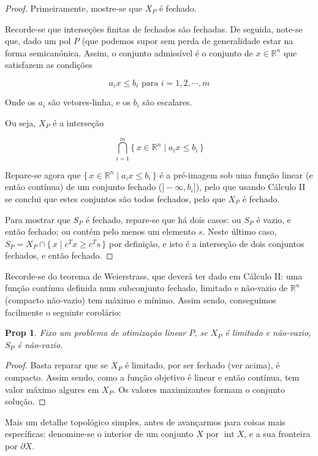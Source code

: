\documentclass{article}
\DeclareMathOperator{\interior}{int}
\newcommand{\R}{\mathbb{R}}
\newtheorem{prop}{Prop}
\theoremstyle{definition}
\begin{document}
	\begin{proof}
	Primeiramente, mostre-se que $X_P$ é fechado.
	
	Recorde-se que interseções finitas de fechados são fechadas. De seguida, note-se que, dado um pol $P$ (que podemos supor sem perda de generalidade estar na forma semicanónica. Assim, o conjunto admissível é o conjunto de $x \in \R^n$ que satisfazem as condições
	
	\[a_i x \leq b_i \text{ para $i = 1, 2, \cdots, m$}\]
	
	Onde os $a_i$ são vetores-linha, e os $b_i$ são escalares.
	
	Ou seja, $X_P$ é a interseção
	
	\[\bigcap_{i=1}^m \{\,x \in \R^n \mid a_i x \leq b_i \,\}\]
	
	Repare-se agora que $\{\,x \in \R^n \mid a_i x \leq b_i \,\}$ é a pré-imagem sob uma função linear (e então contínua) de um conjunto fechado ($]-\infty, b_i]$), pelo que usando Cálculo II se conclui que estes conjuntos são todos fechados, pelo que $X_P$ é fechado.
	
	Para mostrar que $S_P$ é fechado, repare-se que há dois casos: ou $S_P$ é vazio, e então fechado; ou contém pelo menos um elemento $s$. Neste último caso, $S_P = X_P \cap \{\,x \mid c^T x \geq c^T s\,\}$ por definição, e isto é a interseção de dois conjuntos fechados, e então fechado.
	\end{proof}
	
	Recorde-se do teorema de Weierstrass, que deverá ter dado em Cálculo II: uma função contínua definida num subconjunto fechado, limitado e não-vazio de $\R^n$ (compacto não-vazio) tem máximo e mínimo. Assim sendo, conseguimos facilmente o seguinte corolário:
	
	\begin{prop}
	Fixo um problema de otimização linear $P$, se $X_P$ é limitado e não-vazio, $S_P$ é não-vazio.
	\end{prop}
	\begin{proof}
	Basta reparar que se $X_P$ é limitado, por ser fechado (ver acima), é compacto. Assim sendo, como a função objetivo é linear e então contínua, tem valor máximo algures em $X_P$. Os valores maximizantes formam o conjunto solução.
	\end{proof}
	
	Mais um detalhe topológico simples, antes de avançarmos para coisas mais específicas: denomine-se o interior de um conjunto $X$ por $\interior X$, e a sua fronteira por $\partial X$.
	
\end{document}
